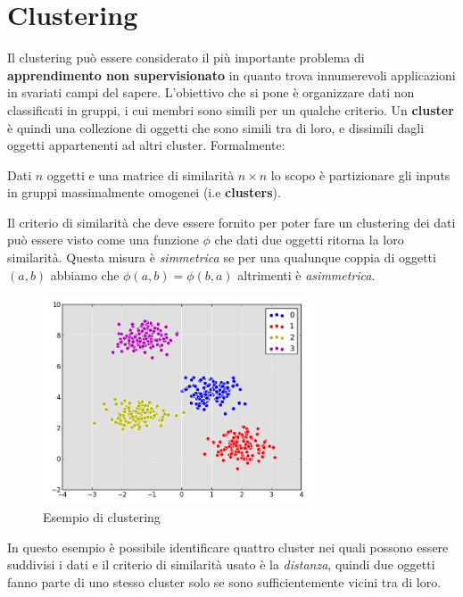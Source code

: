 \chapter{Clustering} %
\label{cha:clustering}

Il clustering può essere considerato il più importante problema di \textbf{apprendimento non supervisionato} in quanto trova innumerevoli applicazioni in svariati campi del sapere. L’obiettivo che si pone è organizzare dati non classificati in gruppi, i cui membri sono simili per un qualche criterio. Un \textbf{cluster} è quindi una collezione di oggetti che sono simili tra di loro, e dissimili dagli oggetti appartenenti ad altri cluster. Formalmente:

\begin{mydef}
	Dati $n$ oggetti e una matrice di similarità $n \times n$ lo scopo è partizionare gli inputs in gruppi massimalmente omogenei (i.e \textbf{clusters}).
\end{mydef}

Il criterio di similarità che deve essere fornito per poter fare un clustering dei dati può essere visto come una funzione $\phi$ che dati due oggetti ritorna la loro similarità. Questa misura è \emph{simmetrica} se per una qualunque coppia di oggetti $(a, b)$ abbiamo che $\phi(a, b) = \phi(b, a)$ altrimenti è \emph{asimmetrica}.\\

\begin{figure}[h!]
	\centering
	\includegraphics[width=8cm]{images/clustering.png}
	\caption{Esempio di clustering}\label{fig:clusters}
\end{figure}

In questo esempio è possibile identificare quattro cluster nei quali possono essere suddivisi i dati e il criterio di similarità usato è la \emph{distanza}, quindi due oggetti fanno parte di uno stesso cluster solo se sono sufficientemente vicini tra di loro. 

